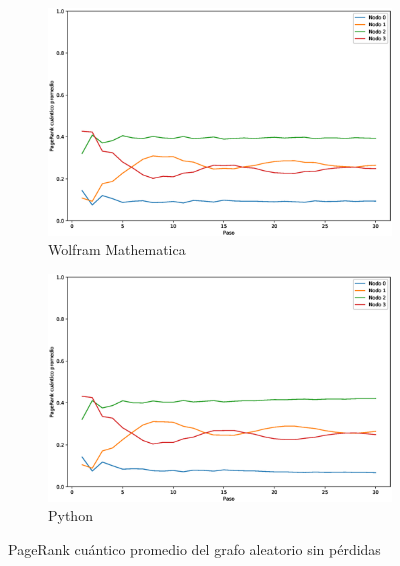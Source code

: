 \documentclass[xetex,mathserif,serif]{beamer}
\begin{document}
\begin{frame}
\begin{figure}[H]
    \centering
    \begin{subfigure}[m]{0.45\textwidth}
        \centering
        \includegraphics[width=0.9\linewidth]{img/any-mean-M.eps}
        \caption{Wolfram Mathematica}
    \end{subfigure}
    \begin{subfigure}[m]{0.45\textwidth}
        \centering
        \includegraphics[width=0.9\linewidth]{img/any-mean-lossless.eps}
        \caption{Python}
    \end{subfigure}
    \caption[PageRank cuántico promedio del grafo aleatorio sin pérdidas]{PageRank cuántico promedio del grafo aleatorio sin pérdidas}
    \label{fig:meananylossless}
\end{figure}


\end{frame}
\end{document}

